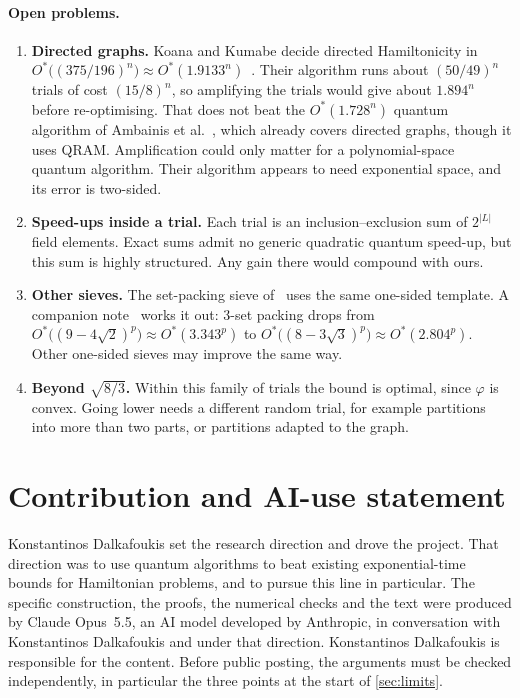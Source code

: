 \documentclass[11pt,a4paper]{article}
\theoremstyle{plain}
\theoremstyle{remark}
\newcommand{\Ostar}{O^{*}}
\begin{document}
\paragraph{Open problems.}
\begin{enumerate}[nosep]
  \item \textbf{Directed graphs.} Koana and Kumabe decide directed Hamiltonicity in $\Ostar\big((375/196)^n\big) \approx \Ostar(1.9133^n)$~\cite{kk}. Their algorithm runs about $(50/49)^n$ trials of cost $(15/8)^n$, so amplifying the trials would give about $1.894^n$ before re-optimising. That does not beat the $\Ostar(1.728^n)$ quantum algorithm of Ambainis et al.~\cite{ambainis}, which already covers directed graphs, though it uses QRAM. Amplification could only matter for a polynomial-space quantum algorithm. Their algorithm appears to need exponential space, and its error is two-sided.
  \item \textbf{Speed-ups inside a trial.} Each trial is an inclusion--exclusion sum of $2^{|L|}$ field elements. Exact sums admit no generic quadratic quantum speed-up, but this sum is highly structured. Any gain there would compound with ours.
  \item \textbf{Other sieves.} The set-packing sieve of~\cite{bhkk} uses the same one-sided template. A companion note~\cite{packing} works it out: 3-set packing drops from $\Ostar\big((9-4\sqrt2)^p\big) \approx \Ostar(3.343^p)$ to $\Ostar\big((8-3\sqrt3)^p\big) \approx \Ostar(2.804^p)$. Other one-sided sieves may improve the same way.
  \item \textbf{Beyond $\sqrt{8/3}$.} Within this family of trials the bound is optimal, since $\varphi$ is convex. Going lower needs a different random trial, for example partitions into more than two parts, or partitions adapted to the graph.
\end{enumerate}

\section*{Contribution and AI-use statement}

Konstantinos Dalkafoukis set the research direction and drove the project. That direction was to use quantum algorithms to beat existing exponential-time bounds for Hamiltonian problems, and to pursue this line in particular. The specific construction, the proofs, the numerical checks and the text were produced by Claude Opus~5.5, an AI model developed by Anthropic, in conversation with Konstantinos Dalkafoukis and under that direction. Konstantinos Dalkafoukis is responsible for the content. Before public posting, the arguments must be checked independently, in particular the three points at the start of \cref{sec:limits}.
\end{document}
